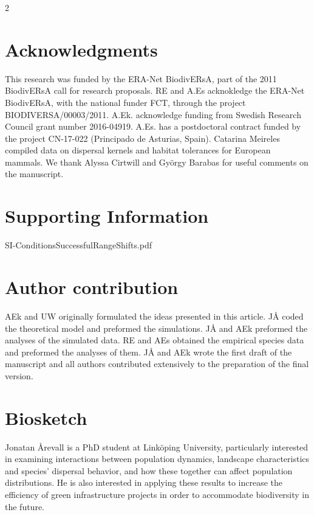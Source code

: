 \documentclass[12pt,pdftex]{article}
\begin{document}
\begin{spacing}{2}
\section*{Acknowledgments}
This research was funded by the ERA-Net BiodivERsA, part of the 2011 BiodivERsA call for research proposals. RE and A.Es acknokledge the ERA-Net
BiodivERsA, with the national funder FCT, through the project BIODIVERSA/00003/2011. A.Ek. acknowledge funding from Swedish Research Council grant number 2016-04919. A.Es. has a postdoctoral contract funded by the project CN-17-022 (Principado de Asturias, Spain). Catarina Meireles compiled data on dispersal kernels and habitat tolerances for European mammals. We thank Alyssa Cirtwill and Gy\"{o}rgy Barabas for useful comments on the manuscript. 


%

\clearpage

\section*{Supporting Information}
SI-ConditionsSuccessfulRangeShifts.pdf

\section*{Author contribution}
AEk and UW originally formulated the ideas presented in this article. J\r{A} coded the theoretical model and preformed the simulations. J\r{A} and AEk preformed the analyses of the simulated data. RE and AEs obtained the empirical species data and preformed the  analyses of them. J\r{A} and AEk wrote the first draft of the manuscript and all authors contributed extensively to the preparation of the final version.

\section*{Biosketch}
Jonatan \r{A}revall is a PhD student at Link\"{o}ping University, particularly interested in examining interactions between population dynamics, landscape characteristics and species’ dispersal behavior, and how these together can affect population distributions. He is also interested in applying these results to increase the efficiency of green infrastructure projects in order to accommodate biodiversity in the future.

\clearpage


\end{spacing}
\end{document}
